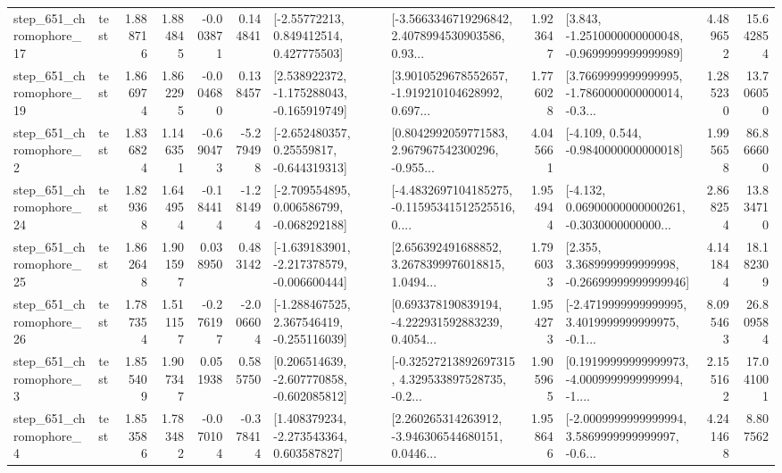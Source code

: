 \begin{tabular}{llrrrrllrlrr}
  step\_651\_chromophore\_17 &      test &      1.888716 &    1.884845 &     -0.003871 &  0.144841 &     [-2.55772213, 0.849412514, 0.427775503] &  [-3.5663346719296842, 2.4078994530903586, 0.93... &       1.923647 &  [3.843, -1.2510000000000048, -0.9699999999999989] &            4.489652 &         15.642854 \\
  step\_651\_chromophore\_19 &      test &      1.866974 &    1.862295 &     -0.004680 &  0.138457 &   [2.538922372, -1.175288043, -0.165919749] &  [3.9010529678552657, -1.919210104628992, 0.697... &       1.776028 &  [3.7669999999999995, -1.7860000000000014, -0.3... &            1.285230 &         13.706050 \\
   step\_651\_chromophore\_2 &      test &      1.836824 &    1.146351 &     -0.690473 & -5.279498 &    [-2.652480357, 0.25559817, -0.644319313] &  [0.8042992059771583, 2.967967542300296, -0.955... &       4.045661 &               [-4.109, 0.544, -0.9840000000000018] &            1.995658 &         86.866600 \\
  step\_651\_chromophore\_24 &      test &      1.829368 &    1.644954 &     -0.184414 & -1.281494 &   [-2.709554895, 0.006586799, -0.068292188] &  [-4.4832697104185275, -0.11595341512525516, 0.... &       1.954944 &  [-4.132, 0.06900000000000261, -0.3030000000000... &            2.868254 &         13.834710 \\
  step\_651\_chromophore\_25 &      test &      1.862648 &    1.901597 &      0.038950 &  0.483142 &  [-1.639183901, -2.217378579, -0.006600444] &  [2.656392491688852, 3.2678399976018815, 1.0494... &       1.796033 &  [2.355, 3.3689999999999998, -0.26699999999999946] &            4.141844 &         18.182309 \\
  step\_651\_chromophore\_26 &      test &      1.787354 &    1.511157 &     -0.276197 & -2.006604 &   [-1.288467525, 2.367546419, -0.255116039] &  [0.693378190839194, -4.222931592883239, 0.4054... &       1.954273 &  [-2.4719999999999995, 3.4019999999999975, -0.1... &            8.095463 &         26.809584 \\
   step\_651\_chromophore\_3 &      test &      1.855409 &    1.907347 &      0.051938 &  0.585750 &   [0.206514639, -2.607770858, -0.602085812] &  [-0.32527213892697315, 4.329533897528735, -0.2... &       1.905965 &  [0.19199999999999973, -4.0009999999999994, -1.... &            2.155162 &         17.041001 \\
   step\_651\_chromophore\_4 &      test &      1.853586 &    1.783482 &     -0.070104 & -0.378414 &    [1.408379234, -2.273543364, 0.603587827] &  [2.260265314263912, -3.946306544680151, 0.0446... &       1.958646 &  [-2.0009999999999994, 3.5869999999999997, -0.6... &            4.241468 &          8.807562 \\

\end{tabular}
